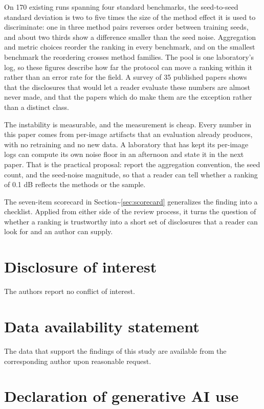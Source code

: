 \documentclass{interact}
\begin{document}
On 170 existing runs spanning four standard benchmarks, the seed-to-seed standard deviation is two to five times the size of the method effect it is used to discriminate: one in three method pairs reverses order between training seeds, and about two thirds show a difference smaller than the seed noise. Aggregation and metric choices reorder the ranking in every benchmark, and on the smallest benchmark the reordering crosses method families. The pool is one laboratory's log, so these figures describe how far the protocol can move a ranking within it rather than an error rate for the field. A survey of 35 published papers shows that the disclosures that would let a reader evaluate these numbers are almost never made, and that the papers which do make them are the exception rather than a distinct class.

The instability is measurable, and the measurement is cheap. Every number in this paper comes from per-image artifacts that an evaluation already produces, with no retraining and no new data. A laboratory that has kept its per-image logs can compute its own noise floor in an afternoon and state it in the next paper. That is the practical proposal: report the aggregation convention, the seed count, and the seed-noise magnitude, so that a reader can tell whether a ranking of 0.1 dB reflects the methods or the sample.

The seven-item scorecard in Section\textasciitilde{}\ref{sec:scorecard} generalizes the finding into a checklist. Applied from either side of the review process, it turns the question of whether a ranking is trustworthy into a short set of disclosures that a reader can look for and an author can supply.

\section*{Disclosure of interest}

The authors report no conflict of interest.

\section*{Data availability statement}


The data that support the findings of this study are available from the corresponding author upon reasonable request.

\section*{Declaration of generative AI use}
\end{document}
